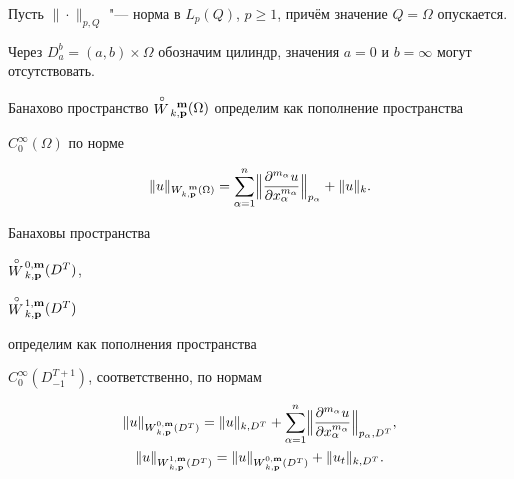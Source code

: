 \smallskip



 Пусть $\| {}\cdot{}\|_{p,Q}$ "--- норма в $L_p(Q)$, $p\geq 1$, причём значение $Q=\Omega$ опускается. 

Через $D_a^b=(a, b)\times\Omega$ обозначим цилиндр, значения $a=0$ и $b=\infty$ могут отсутствовать.



Банахово пространство $\stackrel{\circ}{W}\!{}_{k,{\bf p}}^{\;\;{\bf m}}(\Omega)$ определим как пополнение пространства

$C_0^{\infty}(\Omega)$ по норме

$$

\|u\|_{{W}_{k,{\bf

p}}^{\;\;{\bf m}}(\Omega)}=\sum_{\alpha=1}^n\Bigl\|\frac{\partial^{m_\alpha}u}{\partial x_\alpha^{m_\alpha}}

\Bigr\|_{p_{\alpha}}+\|u \|_k.

$$

Банаховы пространства

 $\stackrel{\circ}{W}\!{_{k,{\bf p}}^{0,{\bf m}}}(D^T)$,

 $\stackrel{\circ}{W}\!{_{k,{\bf p}}^{1,{\bf m}}}(D^T)$

определим как пополнения пространства

$C_0^{\infty}(D_{-1}^{T+1})$, соответственно,  по нормам

\begin{gather*}

 \| u \|_{W{_{k,{\bf p}}^{0,{\bf m}}}(D^T)}=\|u

\|_{k,D^{T}}+\sum_{\alpha=1}^n\Bigl\| \frac{\partial^{m_\alpha}u}{\partial

x_\alpha^{m_\alpha}}\Bigr\|_{p_{\alpha},D^{T}},\\

\| u

\|_{W{_{k,{\bf p}}^{1,{\bf m}}}(D^T)}=\| u \|_{W{_{k,{\bf p}}^{0,{\bf

m}}}(D^T)}+\|u_t \|_{k,D^{T}}.

\end{gather*}



\smallskip



